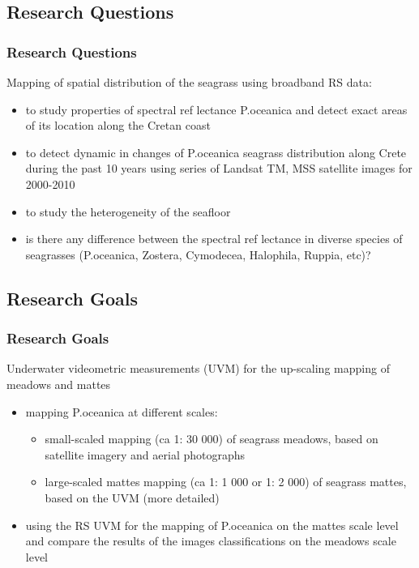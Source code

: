 \documentclass[pdflatex,compress]{beamer}
\begin{document}
\subsection{Research Questions}
\begin{frame}\frametitle{Research Questions}
Mapping of spatial distribution of the seagrass using broadband RS data:
\begin{itemize}
	\item to study properties of spectral ref lectance P.oceanica and detect exact areas of its location along the Cretan coast
	\item to detect dynamic in changes of P.oceanica seagrass distribution along Crete during the past 10 years using series of Landsat TM, MSS satellite images for 2000-2010
	\item to study the heterogeneity of the seafloor
	\item is there any difference between the spectral ref lectance in diverse species of seagrasses (P.oceanica, Zostera, Cymodecea, Halophila, Ruppia, etc)?
\end{itemize}
\end{frame}

\subsection{Research Goals}
\begin{frame}\frametitle{Research Goals}
Underwater videometric measurements (UVM) for the up-scaling mapping of meadows and mattes
\begin{itemize}
	\item mapping P.oceanica at different scales:
	\begin{itemize}
		\item small-scaled mapping (ca 1: 30 000) of seagrass meadows, based on satellite imagery and aerial photographs
		\item large-scaled mattes mapping (ca 1: 1 000 or 1: 2 000) of seagrass mattes, based on the UVM (more detailed)
	\end{itemize}
	\item using the RS UVM for the mapping of P.oceanica on the mattes scale level and compare the results of the images classifications on the meadows scale level
\end{itemize}
\end{frame}
\end{document}
